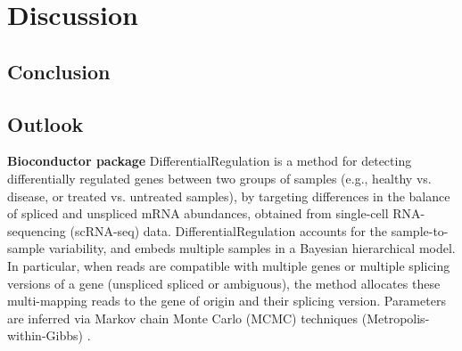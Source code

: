 

\chapter{Discussion}

\section{Conclusion}

\section{Outlook}

\textbf{Bioconductor package} DifferentialRegulation is a method for detecting differentially regulated genes between two groups of samples (e.g., healthy vs. disease, or treated vs. untreated samples), by targeting differences in the balance of spliced and unspliced mRNA abundances, obtained from single-cell RNA-sequencing (scRNA-seq) data. DifferentialRegulation accounts for the sample-to-sample variability, and embeds multiple samples in a Bayesian hierarchical model. In particular, when reads are compatible with multiple genes or multiple splicing versions of a gene (unspliced spliced or ambiguous), the method allocates these multi-mapping reads to the gene of origin and their splicing version. Parameters are inferred via Markov chain Monte Carlo (MCMC) techniques (Metropolis-within-Gibbs) \citep{DifferentialRegulation}.
